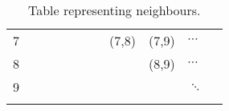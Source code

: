 \begin{table}[!htb]
\begin{tabular}{lllllllllll}
		7 &                               &                               &                               &                               &                               &                               & \cellcolor[HTML]{9B9B9B}(7,8) & \cellcolor[HTML]{C0C0C0}(7,9) & \cellcolor[HTML]{C0C0C0}$\cdots$ &  \\
		8 &                               &                               &                               &                               &                               &                               &                               & \cellcolor[HTML]{C0C0C0}(8,9) & \cellcolor[HTML]{C0C0C0}$\cdots$ &  \\
		9 &                               &                               &                               &                               &                               &                               &                               &                               & $\ddots$                         &  \\
		&                               &                               &                               &                               &                               &                               &                               &                               &                                  & 
	\end{tabular}
	\caption{Table representing neighbours.}
	\label{tab:neighbours}
\end{table}